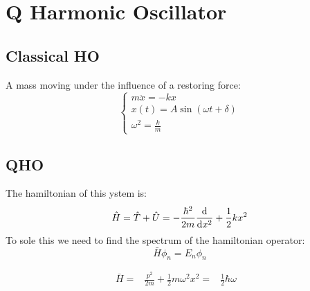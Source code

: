 
\chapter{Q Harmonic Oscillator}

\section{Classical HO}
A mass moving under the influence of a restoring force:
\begin{equation}
    \begin{cases}
    m\ddot{x} = -kx\\
    x(t) = A\sin(\omega t +\delta)\\
    \omega^{2} = \frac{k}{m}
        
    \end{cases}
\end{equation}


\section{QHO}
The hamiltonian of this ystem is:
\begin{equation}
    \hat{H} = \hat{T} + \hat{U} = -\frac{\hbar^{2}}{2m} \odv{}{x^{2}} + \frac{1}{2}kx^{2}
\end{equation}
To sole this we need to find the spectrum of the hamiltonian operator:
\begin{equation}
    \bar{H}\phi_n = E_n\phi_n
\end{equation}

{
    \begin{equation}
        \begin{aligned}
            \bar{H} =& \frac{p^{2}}{2m} + \frac{1}{2}m\omega^{2}x^{2} =& \frac{1}{2}\hbar\omega &\mbox{}\\[1.25ex]
            
            
        \end{aligned}
    \end{equation}
}
